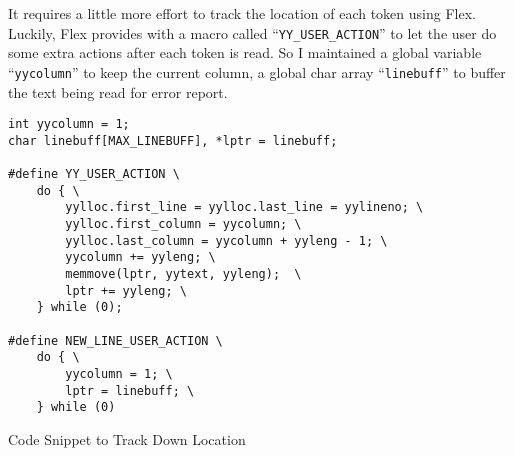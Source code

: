 \documentclass[10pt, a4paper]{article}
\begin{document}
It requires a little more effort to track the location of each token using Flex.
Luckily, Flex provides with a macro called ``\texttt{YY\_USER\_ACTION}'' to let
the user do some extra actions after each token is read. So I maintained a
global variable ``\texttt{yycolumn}'' to keep the current column, a global char
array ``\texttt{linebuff}'' to buffer the text being read for error report.
\begin{listing}[H]
    \centering
    \begin{verbatim}
int yycolumn = 1;
char linebuff[MAX_LINEBUFF], *lptr = linebuff;

#define YY_USER_ACTION \
    do { \
        yylloc.first_line = yylloc.last_line = yylineno; \
        yylloc.first_column = yycolumn; \
        yylloc.last_column = yycolumn + yyleng - 1; \
        yycolumn += yyleng; \
        memmove(lptr, yytext, yyleng);  \
        lptr += yyleng; \
    } while (0);

#define NEW_LINE_USER_ACTION \
    do { \
        yycolumn = 1; \
        lptr = linebuff; \
    } while (0)
\end{verbatim}
\caption {Code Snippet to Track Down Location}
\end{listing}
\end{document}
